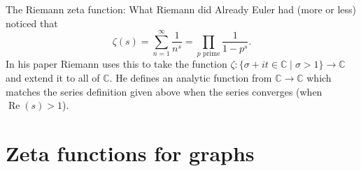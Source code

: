\documentclass{beamer}
\begin{document}
\begin{frame}{The Riemann zeta function: What Riemann did}
Already Euler had (more or less) noticed that 
\[\zeta(s) = \sum_{n=1}^{\infty}\frac{1}{n^s} = \prod_{p \text{ prime}}\frac{1}{1-p^s}.\]
\pause In his paper Riemann uses this to take the function $\zeta\colon \{\sigma + it \in\mathbb{C}\mid \sigma > 1\} \to \mathbb{C}$ and extend it to all of $\mathbb{C}$.
\pause He defines an analytic function from $\mathbb{C} \to \mathbb{C}$ which matches the series definition given above when the series converges (when $\operatorname{Re}(s) > 1$).
\end{frame}


\section{Zeta functions for graphs}
\end{document}
